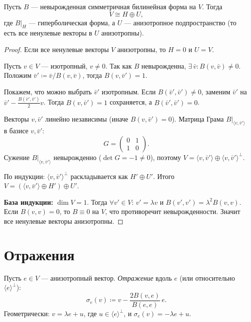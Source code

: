 \begin{stmt}
    Пусть $B$ --- невырожденная симметричная билинейная форма на $V$. Тогда
    \[
        V \cong H \oplus U,
    \]
    где $B\big|_H$ --- гиперболическая форма, а $U$ --- анизотропное подпространство (то есть все ненулевые векторы в
    $U$ анизотропны).

    \begin{proof}
        Если все ненулевые векторы $V$ анизотропны, то $H = 0$ и $U = V$.

        Пусть $v \in V$ --- изотропный, $v \neq 0$. Так как $B$ невырожденна, $\exists\, \bar{v}\colon B(v, \bar{v}) \neq 0$.
        Положим $\bar{v}' \coloneqq \bar{v} / B(v, \bar{v})$, тогда $B(v, \bar{v}') = 1$.

        Покажем, что можно выбрать $\bar{v}'$ изотропным. Если $B(\bar{v}', \bar{v}') \neq 0$,
        заменим $\bar{v}'$ на $\bar{v}' - \frac{B(\bar{v}', \bar{v}')}{2} v$. Тогда $B(v, \bar{v}') = 1$ сохраняется,
        а $B(\bar{v}', \bar{v}') = 0$.

        Векторы $v, \bar{v}'$ линейно независимы (иначе $B(v, \bar{v}') = 0$).
        Матрица Грама $B\big|_{\langle v, \bar{v}' \rangle}$ в базисе $v, \bar{v}'$:
        \[
            G = \begin{pmatrix} 0 & 1 \\ 1 & 0 \end{pmatrix}.
        \]
        Сужение $B\big|_{\langle v, \bar{v}' \rangle}$ невырожденно ($\det G = -1 \neq 0$),
        поэтому $V = \langle v, \bar{v}' \rangle \oplus \langle v, \bar{v}' \rangle^\perp$.

        По индукции: $\langle v, \bar{v}' \rangle^\perp$ раскладывается как $H' \oplus U'$.
        Итого $V = (\langle v, \bar{v}' \rangle \oplus H') \oplus U'$.

        \textbf{База индукции:} $\dim V = 1$. Тогда $\forall v' \in V$: $v' = \lambda v$ и $B(v', v') = \lambda^2 B(v, v)$.
        Если $B(v, v) = 0$, то $B \equiv 0$ на $V$, что противоречит невырожденности. Значит все ненулевые векторы анизотропны.
    \end{proof}
\end{stmt}


\section{Отражения}

\begin{definition}
    Пусть $e \in V$ --- анизотропный вектор. \emph{Отражение} вдоль $e$ (или относительно $\langle e \rangle^\perp$):
    \[
        \sigma_e(v) \coloneqq v - \frac{2B(v, e)}{B(e, e)}\, e.
    \]
    Геометрически: $v = \lambda e + u$, где $u \in \langle e \rangle^\perp$, и $\sigma_e(v) = -\lambda e + u$.
\end{definition}

